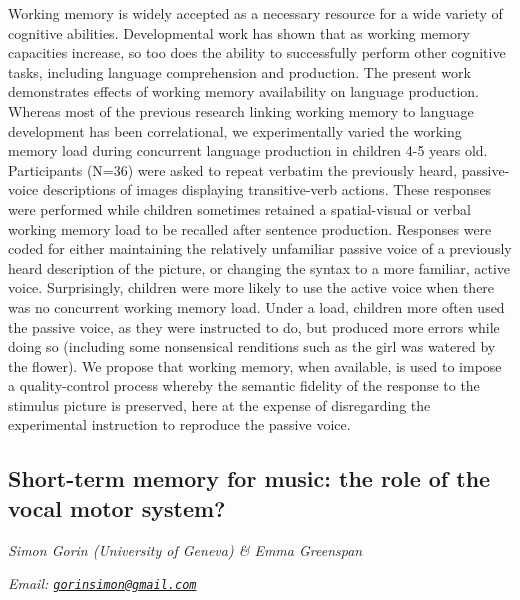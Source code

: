 \documentclass[12pt,]{book}
\begin{document}
Working memory is widely accepted as a necessary resource for a wide variety of cognitive abilities. Developmental work has shown that as working memory capacities increase, so too does the ability to successfully perform other cognitive tasks, including language comprehension and production. The present work demonstrates effects of working memory availability on language production. Whereas most of the previous research linking working memory to language development has been correlational, we experimentally varied the working memory load during concurrent language production in children 4-5 years old. Participants (N=36) were asked to repeat verbatim the previously heard, passive-voice descriptions of images displaying transitive-verb actions. These responses were performed while children sometimes retained a spatial-visual or verbal working memory load to be recalled after sentence production. Responses were coded for either maintaining the relatively unfamiliar passive voice of a previously heard description of the picture, or changing the syntax to a more familiar, active voice. Surprisingly, children were more likely to use the active voice when there was no concurrent working memory load. Under a load, children more often used the passive voice, as they were instructed to do, but produced more errors while doing so (including some nonsensical renditions such as the girl was watered by the flower). We propose that working memory, when available, is used to impose a quality-control process whereby the semantic fidelity of the response to the stimulus picture is preserved, here at the expense of disregarding the experimental instruction to reproduce the passive voice.

\hypertarget{short-term-memory-for-music-the-role-of-the-vocal-motor-system}{%
\subsection{Short-term memory for music: the role of the vocal motor system?}\label{short-term-memory-for-music-the-role-of-the-vocal-motor-system}}

\emph{Simon Gorin (University of Geneva) \& Emma Greenspan}

\emph{Email: \href{mailto:gorinsimon@gmail.com}{\nolinkurl{gorinsimon@gmail.com}}}
\end{document}
